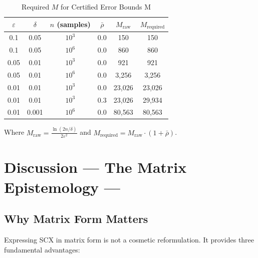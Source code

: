 \documentclass[12pt,a4paper]{article}
\theoremstyle{definition}
\newcommand{\SCX}{\textsc{SCX}}
\begin{document}
\begin{table}[htbp]
\centering
\caption{Required $M$ for Certified Error Bounds M}
\label{tab:required_M}
\begin{tabular}{@{}cccccc@{}}
\toprule
$\varepsilon$ & $\delta$ & $n$ (samples) & $\bar{\rho}$ & $M_{\text{raw}}$ & $M_{\text{required}}$ \\
\midrule
0.1 & 0.05 & $10^3$ & 0.0 & 150 & 150 \\
0.1 & 0.05 & $10^6$ & 0.0 & 860 & 860 \\
0.05 & 0.01 & $10^3$ & 0.0 & 921 & 921 \\
0.05 & 0.01 & $10^6$ & 0.0 & 3,256 & 3,256 \\
0.01 & 0.01 & $10^3$ & 0.0 & 23,026 & 23,026 \\
0.01 & 0.01 & $10^3$ & 0.3 & 23,026 & 29,934 \\
0.01 & 0.001 & $10^6$ & 0.0 & 80,563 & 80,563 \\
\bottomrule
\end{tabular}
\end{table}

Where $M_{\text{raw}} = \frac{\ln(2n/\delta)}{2\varepsilon^2}$ and 
$M_{\text{required}} = M_{\text{raw}} \cdot (1 + \bar{\rho})$.

\section{Discussion — The Matrix Epistemology ---}
\label{sec:discussion}

\subsection{Why Matrix Form Matters }

Expressing \SCX{} in matrix form is not a cosmetic reformulation. It provides three 
fundamental advantages:
\end{document}
